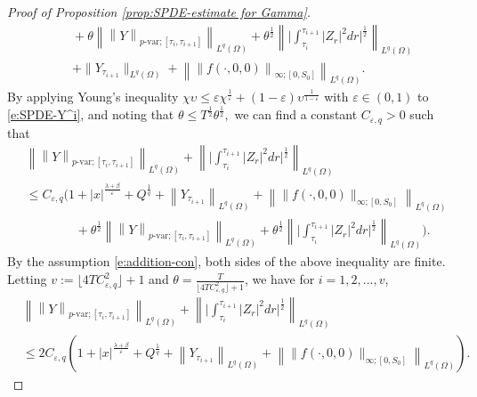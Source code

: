 \documentclass[11pt,reqno]{amsart}
\numberwithin{equation}{section}
\begin{document}
\begin{proof}[Proof of Proposition \ref{prop:SPDE-estimate for Gamma}]
\begin{equation}
\begin{aligned}
&\quad + \theta\left\|\left\|Y\right\|_{p\text{-var};[\tau_{i},\tau_{i+1}]}\right\|_{L^{q}(\Omega)} + \theta^{\frac{1}{2}}\left\|\Big|\int_{\tau_{i}}^{\tau_{i+1}}|Z_{r}|^{2}dr\Big|^{\frac{1}{2}}\right\|_{L^{q}(\Omega)}\\
&\quad + \|Y_{\tau_{i+1}}\|_{L^{q}(\Omega)} + \left\|\left\|f(\cdot,0,0)\right\|_{\infty;[0,S_{0}]}\right\|_{L^{q}(\Omega)}.
\end{aligned}
\end{equation}
By applying Young's inequality  $\chi \upsilon\le \varepsilon \chi^{\frac{1}{\varepsilon}} + (1-\varepsilon) \upsilon^{\frac{1}{1-\varepsilon}}$ with $\varepsilon\in(0,1)$ to \eqref{e:SPDE-Y^i}, and noting that $\theta\le T^{\frac{1}{2}}\theta^{\frac{1}{2}},$ we can find a constant $C_{\varepsilon,q}>0$ such that
\begin{equation*}
\begin{aligned}
&\left\|\left\|Y\right\|_{p\text{-var};[\tau_{i},\tau_{i+1}]}\right\|_{L^{q}(\Omega)} + \left\|\Big|\int_{\tau_{i}}^{\tau_{i+1}}|Z_{r}|^{2}dr\Big|^{\frac{1}{2}}\right\|_{L^{q}(\Omega)}\\
&\le C_{\varepsilon,q}\bigg( 1 + |x|^{\frac{\lambda+\beta}{\varepsilon}} + Q^{\frac{1}{q}} + \left\|Y_{\tau_{i+1}}\right\|_{L^{q}(\Omega)} + \left\|\|f(\cdot,0,0)\|_{\infty;[0,S_{0}]}\right\|_{L^{q}(\Omega)}\\
&\qquad \qquad + \theta^{\frac{1}{2}}\left\|\left\|Y\right\|_{p\text{-var};[\tau_{i},\tau_{i+1}]}\right\|_{L^{q}(\Omega)} + \theta^{\frac{1}{2}}\left\|\Big|\int_{\tau_{i}}^{\tau_{i+1}}|Z_{r}|^{2}dr\Big|^{\frac{1}{2}}\right\|_{L^{q}(\Omega)}\bigg).
\end{aligned}
\end{equation*}
By the assumption \eqref{e:addition-con}, both sides of the above inequality are finite.  Letting $v := \lfloor 4 T C_{\varepsilon,q}^{2}\rfloor + 1$ and $\theta = \frac{T}{\lfloor 4 T C_{\varepsilon,q}^{2}\rfloor + 1}$, we have for $i=1,2,...,v$, 
\begin{equation}\label{e:tau_i Y,Z}
\begin{aligned}
&\left\|\left\|Y\right\|_{p\text{-var};[\tau_{i},\tau_{i+1}]}\right\|_{L^{q}(\Omega)} + \left\|\Big|\int_{\tau_{i}}^{\tau_{i+1}}|Z_{r}|^{2}dr\Big|^{\frac{1}{2}}\right\|_{L^{q}(\Omega)}\\
&\le 2C_{\varepsilon,q} \left( 1 + |x|^{\frac{\lambda+\beta}{\varepsilon}} + Q^{\frac{1}{q}} + \left\|Y_{\tau_{i+1}}\right\|_{L^{q}(\Omega)} + \left\|\|f(\cdot,0,0)\|_{\infty;[0,S_{0}]}\right\|_{L^{q}(\Omega)}\right).
\end{aligned}

\end{equation}
\end{proof}
\end{document}
